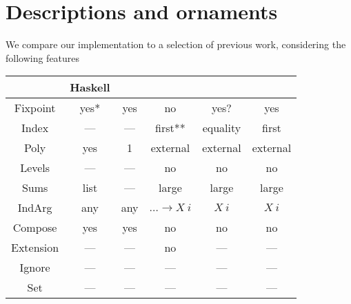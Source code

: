 \documentclass[10pt]{article}
\theoremstyle{plain}
\theoremstyle{definition}
\begin{document}
\section{Descriptions and ornaments}
We compare our implementation to a selection of previous work, considering the following features


\begin{tabular}{c | c c c c c}
             & Haskell        & \cite{initenough} & \cite{levitation} & \cite{algorn} & \cite{progorn} \\
    \hline                                                                                             
    Fixpoint & yes*           & yes               & no                & yes?          & yes            \\
    Index    & —              & —                 & first**           & equality      & first          \\
    Poly     & yes            & 1                 & external          & external      & external       \\
    Levels   & —              & —                 & no                & no            & no             \\
    Sums     & list           & —                 & large             & large         & large          \\
    IndArg   & any            & any               & $\dots \to X\ i$  & $X\ i$        & $X\ i$         \\
    Compose  & yes            & yes               & no                & no            & no             \\
    Extension& —              & —                 & no                & —             & —              \\
    Ignore   & —              & —                 & —                 & —             & —              \\
    Set      & —              & —                 & —                 & —             & —              \\
\end{tabular}
\end{document}

